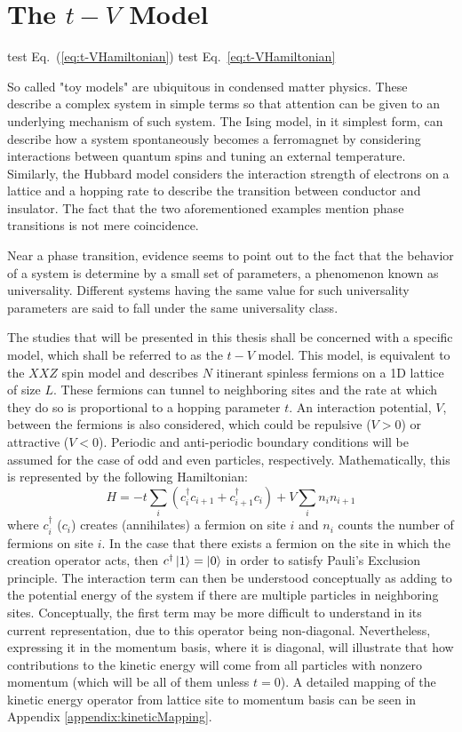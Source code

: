 \section{The $t-V$ Model}
\label{sec:t-VIntro}

test Eq.~(\ref{eq:t-VHamiltonian})
test Eq.~\eqref{eq:t-VHamiltonian}

So called "toy models" are ubiquitous in condensed matter physics. These describe a complex system in simple terms so that attention can be given to an underlying mechanism of such system. The Ising model, in it simplest form, can describe how a system spontaneously becomes a ferromagnet by considering interactions between quantum spins and tuning an external temperature. Similarly, the Hubbard model considers the interaction strength of electrons on a lattice and a hopping rate to describe the transition between conductor and insulator. The fact that the two aforementioned examples mention phase transitions is not mere coincidence. 

Near a phase transition, evidence seems to point out to the fact that the behavior of a system is determine by a small set of parameters, a phenomenon known as universality. Different systems having the same value for such universality parameters are said to fall under the same universality class. 

The studies that will be presented in this thesis shall be concerned with a specific model, which shall be referred to as the $t-V$ model. This model, is equivalent to the $XXZ$ spin model and describes $N$ itinerant spinless fermions on a 1D lattice of size $L$. These fermions can tunnel to neighboring sites and the rate at which they do so is proportional to a hopping parameter $t$. An interaction potential, $V$, between the fermions is also considered, which could be repulsive ($V > 0$) or attractive ($V < 0$). Periodic and anti-periodic boundary conditions will be assumed for the case of odd and even particles, respectively. Mathematically, this is represented by the following Hamiltonian:
%
\begin{equation}
H = -t \sum_{i} \left ( c_{i}^{\dag} c_{i+1} + c_{i+1}^{\dag} c_{i} \right )+ V \sum_{i} n_i n_{i+1}   
\label{eq:t-VHamiltonian}
\end{equation}
%
where $c_{i}^{\dag}$ ($c_{i}$) creates (annihilates) a fermion on site $i$ and $n_{i}$ counts the number of fermions on site $i$. In the case that there exists a fermion on the site in which the creation operator acts, then $c^{\dag} \ket{1} = \ket{0}$ in order to satisfy Pauli's Exclusion principle. The interaction term can then be understood conceptually as adding to the potential energy of the system if there are multiple particles in neighboring sites. Conceptually, the first term may be more difficult to understand in its current representation, due to this operator being non-diagonal. Nevertheless, expressing it in the momentum basis, where it is diagonal, will illustrate that how contributions to the kinetic energy will come from all particles with nonzero momentum (which will be all of them unless $t=0$). A detailed mapping of the kinetic energy operator from lattice site to momentum basis can be seen in Appendix \ref{appendix:kineticMapping}.

